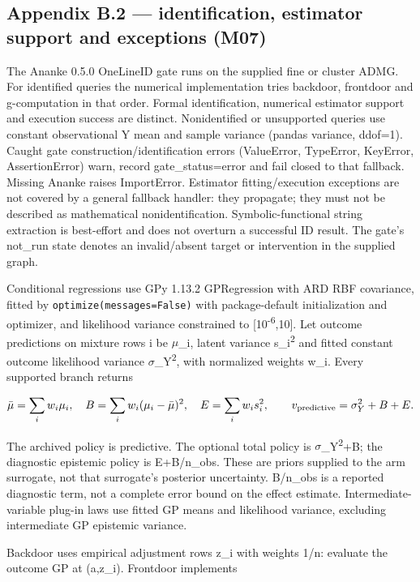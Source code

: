 \subsection*{Appendix B.2 --- identification, estimator support and exceptions (M07)}

The Ananke 0.5.0 OneLineID gate runs on the supplied fine or cluster ADMG. For identified queries the numerical implementation tries backdoor, frontdoor and g-computation in that order. Formal identification, numerical estimator support and execution success are distinct. Nonidentified or unsupported queries use constant observational Y mean and sample variance (pandas variance, ddof=1). Caught gate construction/identification errors (ValueError, TypeError, KeyError, AssertionError) warn, record gate\_status=error and fail closed to that fallback. Missing Ananke raises ImportError. Estimator fitting/execution exceptions are not covered by a general fallback handler: they propagate; they must not be described as mathematical nonidentification. Symbolic-functional string extraction is best-effort and does not overturn a successful ID result. The gate's not\_run state denotes an invalid/absent target or intervention in the supplied graph.

Conditional regressions use GPy 1.13.2 GPRegression with ARD RBF covariance, fitted by \nolinkurl{optimize(messages=False)} with package-default initialization and optimizer, and likelihood variance constrained to [10\textsuperscript{-}\textsuperscript{6},10]. Let outcome predictions on mixture rows i be \ensuremath{\mu}\_i, latent variance s\_i\textsuperscript{2} and fitted constant outcome likelihood variance \ensuremath{\sigma}\_Y\textsuperscript{2}, with normalized weights w\_i. Every supported branch returns

\[
\bar\mu=\sum_iw_i\mu_i,\quad B=\sum_iw_i(\mu_i-\bar\mu)^2,\quad E=\sum_iw_is_i^2,\qquad v_{\rm predictive}=\sigma_Y^2+B+E.
\]

The archived policy is predictive. The optional total policy is \ensuremath{\sigma}\_Y\textsuperscript{2}+B; the diagnostic epistemic policy is E+B/n\_obs. These are priors supplied to the arm surrogate, not that surrogate's posterior uncertainty. B/n\_obs is a reported diagnostic term, not a complete error bound on the effect estimate. Intermediate-variable plug-in laws use fitted GP means and likelihood variance, excluding intermediate GP epistemic variance.

Backdoor uses empirical adjustment rows z\_i with weights 1/n: evaluate the outcome GP at (a,z\_i). Frontdoor implements

